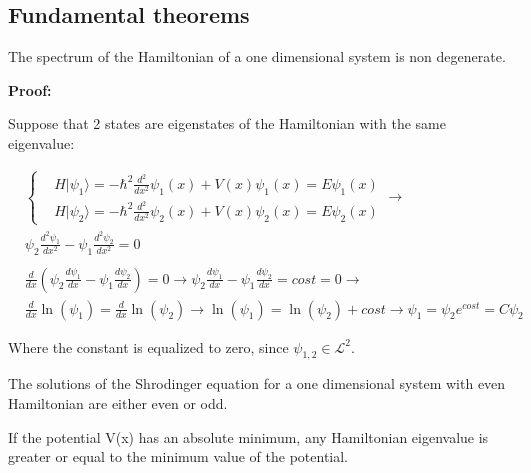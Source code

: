 \documentclass{report}
\begin{document}
\subsection{Fundamental theorems}

\begin{tcolorbox}[colframe=gray!50, colback=gray!10, coltitle=black, title=Non degeneracy of the spectrum]
  The spectrum of the Hamiltonian of a one dimensional system is non degenerate.
\end{tcolorbox}

\textbf{Proof:}

Suppose that 2 states are eigenstates of the Hamiltonian with the same eigenvalue:

\begin{align*}
   & \left\{
  \begin{aligned}
     & H|\psi_1\rangle = -\hbar^2\frac{d^2}{dx^2}\psi_1(x)+V(x)\psi_1(x)=E\psi_1(x) \\
     & H|\psi_2\rangle = -\hbar^2\frac{d^2}{dx^2}\psi_2(x)+V(x)\psi_2(x)=E\psi_2(x)
  \end{aligned}
  \right. \rightarrow                                                                                                                                               \\
   & \psi_2 \frac{d^2 \psi_1}{dx^2} - \psi_1 \frac{d^2 \psi_2}{dx^2}=0                                                                                              \\                                                                                         \\
   & \frac{d}{dx}(\psi_2 \frac{d \psi_1}{dx} - \psi_1 \frac{d \psi_2}{dx})=0 \rightarrow \psi_2 \frac{d \psi_1}{dx} - \psi_1 \frac{d \psi_2}{dx}=cost=0 \rightarrow \\
   & \frac{d}{dx}\ln(\psi_1)=\frac{d}{dx}\ln(\psi_2) \rightarrow \ln(\psi_1)=\ln(\psi_2)+cost \rightarrow \psi_1=\psi_2e^{cost}=C\psi_2
\end{align*}

Where the constant is equalized to zero, since $\psi_{1,2}\in \mathcal{L}^2$.


\begin{tcolorbox}[colframe=gray!50, colback=gray!10, coltitle=black, title=Parity of the solutions]
  The solutions of the Shrodinger equation for a one dimensional system with even Hamiltonian are either even or odd.
\end{tcolorbox}

\begin{tcolorbox}[colframe=gray!50, colback=gray!10, coltitle=black, title=Minimum value]
  If the potential V(x) has an absolute minimum, any Hamiltonian eigenvalue is greater or equal to the minimum value of the potential.
\end{tcolorbox}
\end{document}
